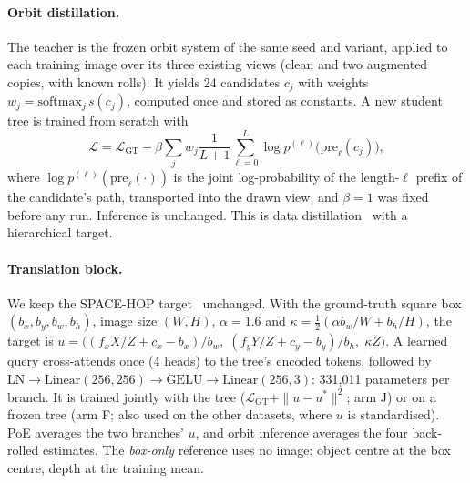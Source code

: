 \paragraph{Orbit distillation.}
The teacher is the frozen orbit system of the same seed and variant, applied to each training image over its three existing views (clean and two augmented copies, with known rolls). It yields 24 candidates $c_j$ with weights $w_j=\mathrm{softmax}_j\,s(c_j)$, computed once and stored as constants. A new student tree is trained from scratch with
\begin{equation}
  \mathcal{L}=\mathcal{L}_{\text{GT}}-\beta\textstyle\sum_{j}w_j\frac{1}{L+1}\sum_{\ell=0}^{L}\log p^{(\ell)}\big(\mathrm{pre}_\ell(c_j)\big),
\end{equation}
where $\log p^{(\ell)}(\mathrm{pre}_\ell(\cdot))$ is the joint log-probability of the length-$\ell$ prefix of the candidate's path, transported into the drawn view, and $\beta=1$ was fixed before any run. Inference is unchanged. This is data distillation~\cite{radosavovic2018data,hinton2015distilling} with a hierarchical target.

\paragraph{Translation block.}
We keep the SPACE-HOP target~\cite{dutta2026spacehop} unchanged. With the ground-truth square box $(b_x,b_y,b_w,b_h)$, image size $(W,H)$, $\alpha=1.6$ and $\kappa=\tfrac12(\alpha b_w/W+b_h/H)$, the target is $u=\big((f_xX/Z+c_x-b_x)/b_w,\;(f_yY/Z+c_y-b_y)/b_h,\;\kappa Z\big)$. A learned query cross-attends once (4 heads) to the tree's encoded tokens, followed by $\mathrm{LN}\to\mathrm{Linear}(256,256)\to\mathrm{GELU}\to\mathrm{Linear}(256,3)$: 331,011 parameters per branch. It is trained jointly with the tree ($\mathcal{L}_{\text{GT}}+\|u-u^*\|^2$; arm J) or on a frozen tree (arm F; also used on the other datasets, where $u$ is standardised). PoE averages the two branches' $u$, and orbit inference averages the four back-rolled estimates. The \emph{box-only} reference uses no image: object centre at the box centre, depth at the training mean.

